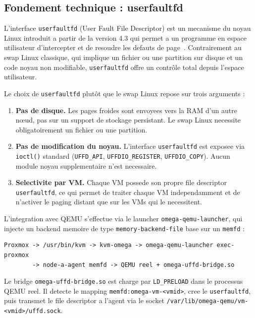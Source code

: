 \subsection{Fondement technique : userfaultfd}
\label{subsec:userfaultfd}

L'interface \texttt{userfaultfd} (User Fault File Descriptor) est un mecanisme du noyau Linux introduit a partir de la version 4.3 qui permet a un programme en espace utilisateur d'intercepter et de resoudre les defauts de page~\cite{userfaultfd_man}. Contrairement au swap Linux classique, qui implique un fichier ou une partition sur disque et un code noyau non modifiable, \texttt{userfaultfd} offre un contr\^ole total depuis l'espace utilisateur.

Le choix de \texttt{userfaultfd} plut\^ot que le swap Linux repose sur trois arguments :

\begin{enumerate}
    \item \textbf{Pas de disque.} Les pages froides sont envoyees vers la RAM d'un autre n\oe{}ud, pas sur un support de stockage persistant. Le swap Linux necessite obligatoirement un fichier ou une partition.
    \item \textbf{Pas de modification du noyau.} L'interface \texttt{userfaultfd} est exposee via \texttt{ioctl()} standard (\texttt{UFFD\_API}, \texttt{UFFDIO\_REGISTER}, \texttt{UFFDIO\_COPY}). Aucun module noyau supplementaire n'est necessaire.
    \item \textbf{Selectivite par VM.} Chaque VM possede son propre file descriptor \texttt{userfaultfd}, ce qui permet de traiter chaque VM independamment et de n'activer le paging distant que sur les VMs qui le necessitent.
\end{enumerate}

L'integration avec QEMU s'effectue via le launcher \texttt{omega-qemu-launcher}, qui injecte un backend memoire de type \texttt{memory-backend-file} base sur un \texttt{memfd} :

\begin{verbatim}
Proxmox -> /usr/bin/kvm -> kvm-omega -> omega-qemu-launcher exec-proxmox
        -> node-a-agent memfd -> QEMU reel + omega-uffd-bridge.so
\end{verbatim}

Le bridge \texttt{omega-uffd-bridge.so} est charge par \texttt{LD\_PRELOAD} dans le processus QEMU reel. Il detecte le mapping \texttt{memfd:omega-vm-<vmid>}, cree le \texttt{userfaultfd}, puis transmet le file descriptor a l'agent via le socket \texttt{/var/lib/omega-qemu/vm-<vmid>/uffd.sock}.


